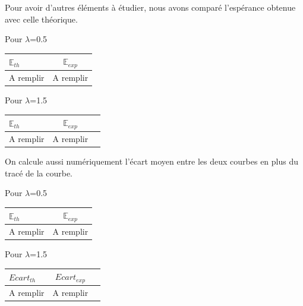 \documentclass[12,french]{report}
\begin{document}
Pour avoir d'autres éléments à étudier, nous avons comparé l'espérance obtenue avec celle théorique. \\

\begin{minipage}{0.5\textwidth}
		\begin{flushleft} \large\center
			Pour $\lambda$=0.5 \vspace{0.4cm}
			
				\begin{tabular}{|l|c|}
 				\hline
			    $\mathbb{E}_{th}$ & $\mathbb{E}_{exp}$ \\
    			\hline
   				A remplir & A remplir \\
   				\hline
   				\end{tabular}
		\end{flushleft}
	\end{minipage}
	\begin{minipage}{0.4\textwidth}
		\begin{flushright} \large\center
			Pour $\lambda$=1.5 \vspace{0.4cm}
			
				\begin{tabular}{|l|c|r|}
				\hline
			    $\mathbb{E}_{th}$ & $\mathbb{E}_{exp}$ \\
    			\hline
   				A remplir & A remplir \\
   				\hline
   				\end{tabular}
		\end{flushright}
	\end{minipage}\vspace{0.5cm}

On calcule aussi numériquement l'écart moyen entre les deux courbes en plus du tracé de la courbe.\\

\begin{minipage}{0.5\textwidth}
		\begin{flushleft} \large\center
			Pour $\lambda$=0.5 \vspace{0.4cm}
			
				\begin{tabular}{|l|c|}
 				\hline
			    $\mathbb{E}_{th}$ & $\mathbb{E}_{exp}$ \\
    			\hline
   				A remplir & A remplir \\
   				\hline
   				\end{tabular}
		\end{flushleft}
	\end{minipage}
	\begin{minipage}{0.4\textwidth}
		\begin{flushright} \large\center
			Pour $\lambda$=1.5 \vspace{0.4cm}
			
				\begin{tabular}{|l|c|r|}
				\hline
			    $Ecart_{th}$ & $Ecart_{exp}$ \\
    			\hline
   				A remplir & A remplir \\
   				\hline
   				\end{tabular}
		\end{flushright}
	\end{minipage}\vspace{0.5cm}
\end{document}
